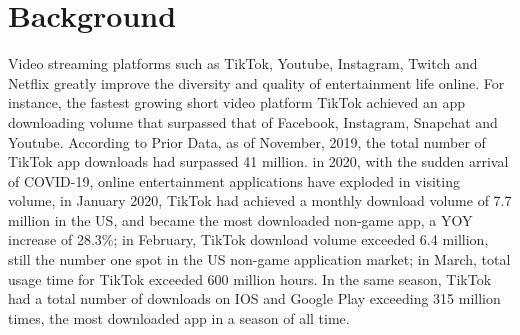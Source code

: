 \documentclass[12pt, a4paper, unicode]{report}
\begin{document}
%
%


\renewcommand\thechapter{\arabic{chapter}}

\epigraphhead{} %



    \chapter{Background}
    
    Video streaming platforms such as TikTok, Youtube, Instagram, Twitch and Netflix greatly improve the diversity and quality of entertainment life online. For instance, the fastest growing short video platform TikTok achieved an app downloading volume that surpassed that of Facebook, Instagram, Snapchat and Youtube. According to Prior Data, as of November, 2019, the total number of TikTok app downloads had surpassed 41 million. in 2020, with the sudden arrival of COVID-19, online entertainment applications have exploded in visiting volume, in January 2020, TikTok had achieved a monthly download volume of 7.7 million in the US, and became the most downloaded non-game app, a YOY increase of 28.3\%; in February, TikTok download volume exceeded 6.4 million, still the number one spot in the US non-game application market; in March, total usage time for TikTok exceeded 600 million hours. In the same season, TikTok had a total number of downloads on IOS and Google Play exceeding 315 million times, the most downloaded app in a season of all time.
    
\end{document}
